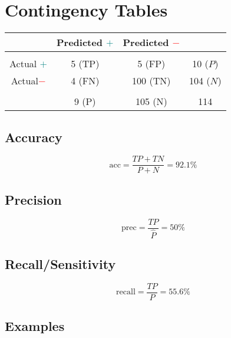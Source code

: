 
\section{Contingency Tables}%

\begin{tabular}{c | c c | c}
    & Predicted \textcolor{teal}{$+$} & Predicted \textcolor{red}{$-$} & \\
    \hline \\
  Actual \textcolor{teal}{$+$} & 5 (TP) & 5 (FP) & 10 ($\hat P$) \\
  Actual\textcolor{red}{$-$} & 4 (FN) & 100 (TN) & 104 ($\hat N$) \\
  \hline \\
               & 9 (P) & 105 (N) & 114
\end{tabular}

\subsection{Accuracy}%

\begin{equation}
  \text{acc} = \frac{TP + TN}{P+N} = 92.1\%
\end{equation}

\subsection{Precision}%

\begin{equation}
  \text{prec} = \frac{TP}{\hat P} = 50\%
\end{equation}

\subsection{Recall/Sensitivity}%

\begin{equation}
  \text{recall} = \frac{TP}{P} = 55.6\%
\end{equation}

\subsection{Examples}%

